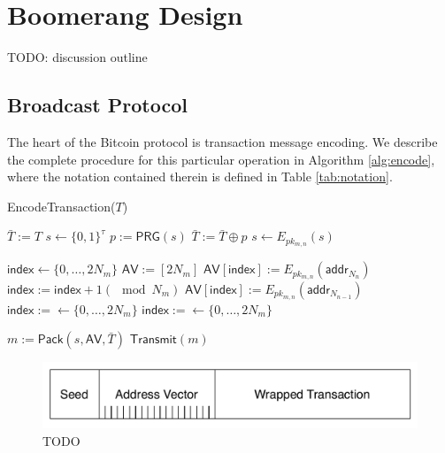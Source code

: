 \section{Boomerang Design}

TODO: discussion outline

\subsection{Broadcast Protocol}

The heart of the Bitcoin protocol is transaction message encoding. We describe the complete procedure for this particular operation in Algorithm \ref{alg:encode}, where the notation contained therein is defined in Table \ref{tab:notation}.

\begin{algorithm*}[t!]
\caption{{\sf EncodeTransaction}($T$)}
\label{alg:encode}
\begin{algorithmic}[1]

	\State $\bar{T} := T$
	\State $s \gets \{0,1\}^{\tau}$
		\State $p := \mathsf{PRG}(s)$
		\State $\bar{T} := \bar{T} \oplus p$
		\State $s \gets E_{pk_{m,n}}(s)$
	\EndFor

	\State $\mathsf{index} \gets \{0,\dots,2N_m\}$ %
	\State $\mathsf{AV} := [2N_m]$ %
		\State $\mathsf{AV}[\mathsf{index}] := E_{pk_{m,n}}(\mathsf{addr}_{N_n})$
		\State $\mathsf{index} := \mathsf{index} + 1 (\mod N_m)$
		\State $\mathsf{AV}[\mathsf{index}] := E_{pk_{m,n}}(\mathsf{addr}_{N_{n-1}})$
		\State $\mathsf{index} := \gets \{0,\dots,2N_m\}$
			\State $\mathsf{index} := \gets \{0,\dots,2N_m\}$
		\EndWhile
	\EndFor

	\State $m := \mathsf{Pack}(s, \mathsf{AV}, \bar{T})$
	\State $\mathsf{Transmit}(m)$
\EndFor

\end{algorithmic}
\end{algorithm*}

\begin{figure}[ht!]
\begin{center}
\includegraphics[scale=0.5]{./images/boomerang_message.pdf}
\caption{TODO}
\label{fig:boomerang_message}
\end{center}
\end{figure}

